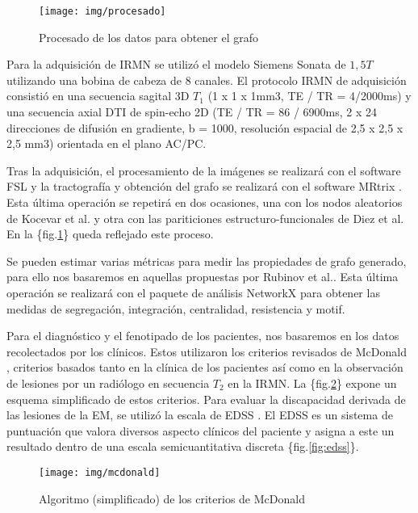 \documentclass[fleqn,12pt]{UICArticle} %
\begin{document}
\begin{figure}[h]
	\centering
	\texttt{[image: img/procesado]}
	\vspace{5mm} 
	\caption{Procesado de los datos para obtener el grafo}
	\label{fig:pipeline}
\end{figure}


Para la adquisición de IRMN se utilizó el modelo Siemens Sonata de $1,5T$ utilizando una bobina de cabeza de $8$ canales. El protocolo IRMN de adquisición consistió en una secuencia sagital 3D $T_1$ (1 x 1 x 1mm3, TE / TR = 4/2000ms) y una secuencia axial DTI de spin-echo 2D (TE / TR = 86 / 6900ms, 2 x 24 direcciones de difusión en gradiente, b = 1000, resolución espacial de 2,5 x 2,5 x 2,5 mm3) orientada en el plano AC/PC.

Tras la adquisición, el procesamiento de la imágenes se realizará con el software FSL \cite{Jenkinson2012} y la tractografía y obtención del grafo se realizará con el software MRtrix \cite{Tournier2012}. Esta última operación se repetirá en dos ocasiones, una con los nodos aleatorios de Kocevar et al. y otra con las pariticiones estructuro-funcionales de Diez et al. En la \{fig.\ref{fig:pipeline}\} queda reflejado este proceso.

Se pueden estimar varias métricas para medir las propiedades de grafo generado, para ello nos basaremos en aquellas propuestas por Rubinov et al.\cite{Rubinov2010}. Esta última operación se realizará con el paquete de análisis NetworkX \cite{Daducci2012} para obtener las medidas de segregación, integración, centralidad, resistencia y motif.


Para el diagnóstico y el fenotipado de los pacientes, nos basaremos en los datos recolectados por los clínicos. Estos utilizaron los criterios revisados de McDonald \cite{Mcdonald2001, Polman2011}, criterios basados tanto en la clínica de los pacientes así como en la observación de lesiones por un radiólogo en secuencia $T_2$ en la IRMN. La \{fig.\ref{fig:mcdonald}\} expone un esquema simplificado de estos criterios.  Para evaluar la discapacidad derivada de las lesiones de la EM, se utilizó la escala de EDSS \cite{Kurtzke1983}. El EDSS es un sistema de puntuación que valora diversos aspecto clínicos del paciente y asigna a este un resultado dentro de una escala semicuantitativa discreta \{fig.\ref{fig:edss}\}.

\begin{figure}[b]
	\centering
	\texttt{[image: img/mcdonald]}
	\vspace{5mm} 
	\caption{Algoritmo (simplificado) de los criterios de McDonald}
	\label{fig:mcdonald}
\end{figure}
\end{document}
